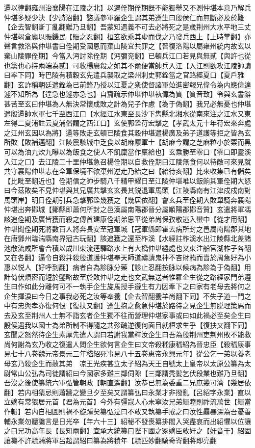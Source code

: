 遹以律翻雍州治襄陽在江陵之北】以遏佺期佺期旣不能獨舉又不測仲堪本意乃解兵仲堪多疑少決【少詩沼翻】諮議參軍羅企生謂其弟遵生曰殷侯仁而無斷必及於難【企去智翻斷丁亂翻難乃旦翻】吾蒙知遇義不可去必將死之是歲荆州大水平地三丈仲堪竭倉廪以賑饑民【賑之忍翻】桓玄欲乘其虛而伐之乃發兵西上【上時掌翻】亦聲言救洛與仲堪書曰佺期受國恩而棄山陵宜共罪之【晉復洛陽以屬雍州統内故玄以棄山陵罪佺期】今當入沔討除佺期【沔彌兖翻】已頓兵江口若見與無貳【與許也從也黨也心持兩端為貳】可收楊廣殺之如其不爾便當帥兵入江【入江則欲攻江陵帥讀曰率下同】時巴陵有積穀玄先遣兵襲取之梁州刺史郭銓當之官路經夏口【夏戶雅翻】玄詐稱朝廷遣銓為已前鋒乃授以江夏之衆使督諸軍竝進密報兄偉令為内應偉遑遽不知所為【遑急也遽亦急也】自齎疏示仲堪仲堪執偉為質【質音致】令與玄書辭甚苦至玄曰仲堪為人無決常懷成敗之計為兒子作慮【為于偽翻】我兄必無憂也仲堪遣殷遹帥水軍七千至西江口【水經江水東至長沙下雋縣北湘水從南來注之江水又東左得二夏浦註云夏浦俗謂之西江口】玄使郭銓苻宏擊之【孝武太元十年苻宏來奔處之江州玄因以為將】遹等敗走玄頓已陵食其穀仲堪遣楊廣及弟子道護等拒之皆為玄所敗【敗補邁翻】江陵震駭城中乏食以胡麻廪軍士【胡麻今謂之芝麻粒小於粟而黑可以為油九炊九曝以為飯食之使人不飢廩當作稟給也】玄乘勝至零口【零口即靈溪入江之口】去江陵二十里仲堪急召楊佺期以自救佺期曰江陵無食何以待敵可來見就共守襄陽仲堪志在全軍保境不欲棄州逆走乃紿之曰【紿待亥翻】比來收集已有儲矣【比毗至翻近也】佺期信之帥步騎八千精甲耀日至江陵仲堪唯以飯餉其軍佺期大怒曰今茲敗矣不見仲堪與其兄廣共擊玄玄畏其鋭退軍馬頭【江陵縣南有江津戍戍南對馬頭岸】明日佺期引兵急擊郭銓幾獲之【幾居依翻】會玄兵至佺期大敗單騎奔襄陽仲堪出奔鄼城【鄼縣即蕭何所封之邑漢屬南陽郡晉分屬順陽郡鄼音贊】玄遣將軍馮該追佺期及廣皆獲而殺之傳首建康佺期弟思平從弟尚保孜敬逃入蠻中【從才用翻】仲堪聞佺期死將數百人將奔長安至冠軍城【冠軍縣即霍去病所封之邑屬南陽郡其地在唐鄧州臨湍縣南界冠古玩翻】該追獲之還至柞溪【水經註柞溪水出江陵縣北盖諸池散流咸所會合積以成川東流逕驛路水上有大橋仲堪縊處也又東注船官湖柞子各翻又在各翻】逼令自殺并殺殷道護仲堪奉天師道禱請鬼神不吝財賄而嗇於周急好為小惠以悦人【好呼到翻】病者自為診脉分藥【診止忍翻按脉以候病為診為于偽翻】用計倚伏煩密而短於鑒略故至於敗仲堪之走也文武無送者惟羅企生從之路經家門弟遵生曰作如此分離何可不一執手企生旋馬授手遵生有力因牽下之曰家有老母去將何之企生揮淚曰今日之事我必死之汝等奉養【企去智翻養羊尚翻下同】不失子道一門之中有忠與孝亦復何恨【復扶又翻】遵生抱之愈急仲堪於路待之見企生無脱理策馬而去及玄至荆州人士無不詣玄者企生獨不往而營理仲堪家事或曰如此禍必至矣企生曰殷侯遇我以國士為弟所制不得隨之共殄醜逆復何面目就桓求生乎【復扶又翻下同】玄聞之怒然待企生素厚先遣人謂曰若謝我當釋汝企生曰吾為殷荆州吏荆州敗不能救尚何謝為玄乃收之復遣人問企生欲何言企生曰文帝殺嵇康嵇紹為晉忠臣【殺嵇康事見七十八卷魏元帝景元三年嵇紹死事見八十五卷惠帝永興元年】從公乞一弟以養老母玄乃殺企生而赦其弟　凉王光疾甚立太子紹為天王自號太上皇帝以太原公纂為太尉常山公弘為司徒謂紹曰今國家多難三鄰伺隙【三鄰謂秃髪乞伏段業也難乃旦翻】吾沒之後使纂統六軍弘管朝政【朝直遙翻】汝恭已無為委重二兄庶幾可濟【幾居依翻】若内相猜忌則蕭牆之變旦夕至矣又謂纂弘曰永業才非撥亂【呂紹字永業】直以立嫡有常猥居元首【君為元首】今外有彊寇人心未寧汝兄弟緝睦則祚流萬世【緝當作輯】若内自相圖則禍不旋踵矣纂弘泣曰不敢又執纂手戒之曰汝性麤暴深為吾憂善輔永業勿聽讒言是日光卒【年六十三】紹秘不發喪纂排閤入哭盡哀而出紹懼以位讓之曰兄功高年長【長知兩翻】宜承大統纂曰陛下國之冢嫡臣敢奸之【奸音干】紹固讓纂不許驃騎將軍呂超謂紹曰纂為將積年【驃匹妙翻騎奇寄翻將即亮翻